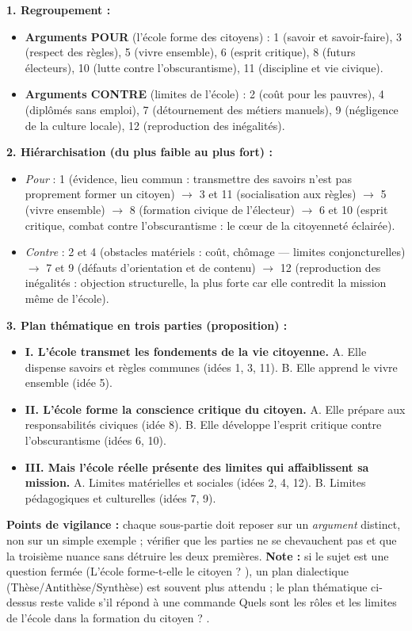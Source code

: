 \documentclass[11pt]{article}
\begin{document}
\begin{corrige}
\textbf{1. Regroupement :}
\begin{itemize}
\item \textbf{Arguments POUR} (l'école forme des citoyens) : 1 (savoir et savoir-faire), 3 (respect des règles), 5 (vivre ensemble), 6 (esprit critique), 8 (futurs électeurs), 10 (lutte contre l'obscurantisme), 11 (discipline et vie civique).
\item \textbf{Arguments CONTRE} (limites de l'école) : 2 (coût pour les pauvres), 4 (diplômés sans emploi), 7 (détournement des métiers manuels), 9 (négligence de la culture locale), 12 (reproduction des inégalités).
\end{itemize}

\textbf{2. Hiérarchisation (du plus faible au plus fort) :}
\begin{itemize}
\item \emph{Pour} : 1 (évidence, lieu commun : transmettre des savoirs n'est pas proprement former un citoyen) $\rightarrow$ 3 et 11 (socialisation aux règles) $\rightarrow$ 5 (vivre ensemble) $\rightarrow$ 8 (formation civique de l'électeur) $\rightarrow$ 6 et 10 (esprit critique, combat contre l'obscurantisme : le cœur de la citoyenneté éclairée).
\item \emph{Contre} : 2 et 4 (obstacles matériels : coût, chômage — limites conjoncturelles) $\rightarrow$ 7 et 9 (défauts d'orientation et de contenu) $\rightarrow$ 12 (reproduction des inégalités : objection structurelle, la plus forte car elle contredit la mission même de l'école).
\end{itemize}

\textbf{3. Plan thématique en trois parties (proposition) :}
\begin{itemize}
\item \textbf{I. L'école transmet les fondements de la vie citoyenne.} A. Elle dispense savoirs et règles communes (idées 1, 3, 11). B. Elle apprend le vivre ensemble (idée 5).
\item \textbf{II. L'école forme la conscience critique du citoyen.} A. Elle prépare aux responsabilités civiques (idée 8). B. Elle développe l'esprit critique contre l'obscurantisme (idées 6, 10).
\item \textbf{III. Mais l'école réelle présente des limites qui affaiblissent sa mission.} A. Limites matérielles et sociales (idées 2, 4, 12). B. Limites pédagogiques et culturelles (idées 7, 9).
\end{itemize}
\textbf{Points de vigilance :} chaque sous-partie doit reposer sur un \emph{argument} distinct, non sur un simple exemple ; vérifier que les parties ne se chevauchent pas et que la troisième nuance sans détruire les deux premières. \textbf{Note :} si le sujet est une question fermée (\og L'école forme-t-elle le citoyen ? \fg{}), un plan dialectique (Thèse/Antithèse/Synthèse) est souvent plus attendu ; le plan thématique ci-dessus reste valide s'il répond à une commande \og Quels sont les rôles et les limites de l'école dans la formation du citoyen ? \fg{}.
\end{corrige}
\end{document}
